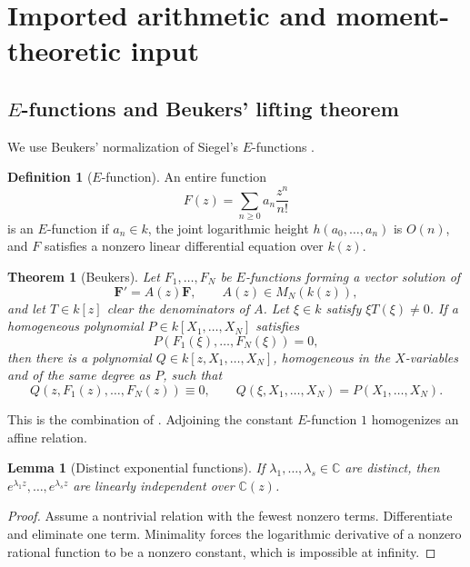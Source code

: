 \documentclass[11pt]{article}
\numberwithin{equation}{section}
\newtheorem{theorem}{Theorem}[section]
\newtheorem{lemma}[lemma]{Lemma}
\theoremstyle{definition}
\newtheorem{definition}[definition]{Definition}
\theoremstyle{remark}
\newcommand{\C}{\mathbb C}
\begin{document}
\section{Imported arithmetic and moment-theoretic input}
\label{sec:input}

\subsection{\texorpdfstring{$E$}{E}-functions and Beukers' lifting theorem}

We use Beukers' normalization of Siegel's $E$-functions
\cite[Section~1]{Beukers}.

\begin{definition}[$E$-function]
An entire function
\[
  F(z)=\sum_{n\ge0}a_n\frac{z^n}{n!}
\]
is an $E$-function if $a_n\in k$, the joint logarithmic height
$h(a_0,\ldots,a_n)$ is $O(n)$, and $F$ satisfies a nonzero linear
differential equation over $k(z)$.
\end{definition}

\begin{theorem}[Beukers]\label{thm:Beukers}
Let $F_1,\ldots,F_N$ be $E$-functions forming a vector solution of
\[
  \mathbf F'=A(z)\mathbf F,
  \qquad A(z)\in M_N(k(z)),
\]
and let $T\in k[z]$ clear the denominators of $A$.  Let
$\xi\in k$ satisfy $\xi T(\xi)\ne0$.  If a homogeneous polynomial
$P\in k[X_1,\ldots,X_N]$ satisfies
\[
  P(F_1(\xi),\ldots,F_N(\xi))=0,
\]
then there is a polynomial
$Q\in k[z,X_1,\ldots,X_N]$, homogeneous in the $X$-variables and of the
same degree as $P$, such that
\[
  Q(z,F_1(z),\ldots,F_N(z))\equiv0,
  \qquad
  Q(\xi,X_1,\ldots,X_N)=P(X_1,\ldots,X_N).
\]
\end{theorem}

This is the combination of \cite[Theorems~1.3 and~3.2]{Beukers}.  Adjoining
the constant $E$-function $1$ homogenizes an affine relation.

\begin{lemma}[Distinct exponential functions]\label{lem:distinct-exponentials}
If $\lambda_1,\ldots,\lambda_s\in\C$ are distinct, then
$e^{\lambda_1z},\ldots,e^{\lambda_sz}$ are linearly independent over
$\C(z)$.
\end{lemma}

\begin{proof}
Assume a nontrivial relation with the fewest nonzero terms.  Differentiate
and eliminate one term.  Minimality forces the logarithmic derivative of a
nonzero rational function to be a nonzero constant, which is impossible at
infinity.
\end{proof}
\end{document}
